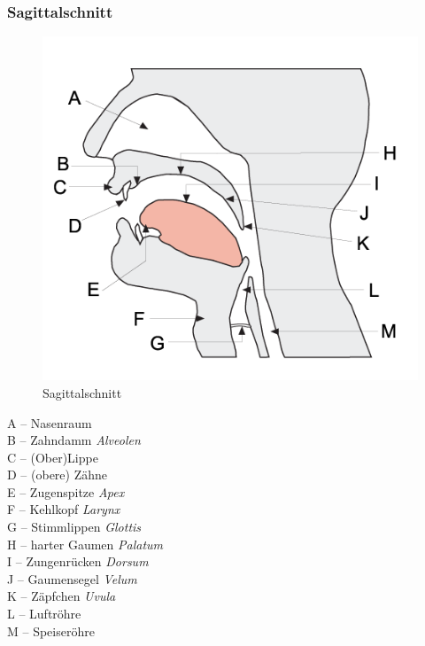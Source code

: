 \begin{frame}
\frametitle{Sagittalschnitt}

\begin{minipage}{0.48\textwidth}
	\begin{figure}
	\centering
	\includegraphics[scale=0.32]{material/04phonoatonomy}
	\caption{Sagittalschnitt}
	\end{figure}
\end{minipage}\hfill
\begin{minipage}{0.4\textwidth}
	A -- Nasenraum\\
	B -- Zahndamm \emph{Alveolen}\\
	C -- (Ober)Lippe \\
	D -- (obere) Zähne\\
	E -- Zugenspitze \emph{Apex}\\
	F -- Kehlkopf \emph{Larynx}\\
	G -- Stimmlippen \emph{Glottis}\\
	H -- harter Gaumen \emph{Palatum}\\
	I -- Zungenrücken \emph{Dorsum}\\
	J -- Gaumensegel \emph{Velum}\\
	K -- Zäpfchen \emph{Uvula}\\
	L -- Luftröhre\\ 
	M -- Speiseröhre
\end{minipage}
	
%		
	
\end{frame}



